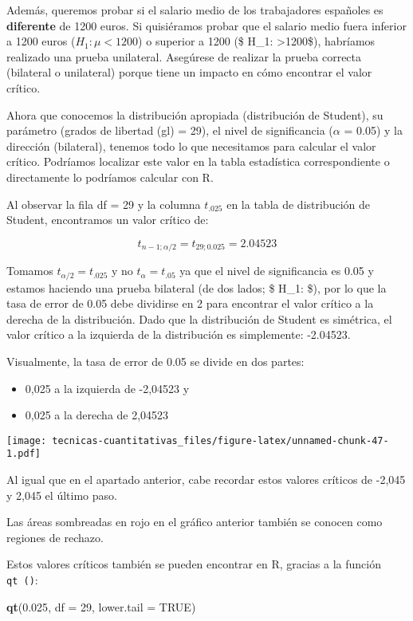 \documentclass[
]{book}
\newenvironment{Shaded}{\begin{snugshade}}{\end{snugshade}}
\newcommand{\DataTypeTok}[1]{\textcolor[rgb]{0.13,0.29,0.53}{#1}}
\newcommand{\DecValTok}[1]{\textcolor[rgb]{0.00,0.00,0.81}{#1}}
\newcommand{\FloatTok}[1]{\textcolor[rgb]{0.00,0.00,0.81}{#1}}
\newcommand{\KeywordTok}[1]{\textcolor[rgb]{0.13,0.29,0.53}{\textbf{#1}}}
\newcommand{\NormalTok}[1]{#1}
\newcommand{\OtherTok}[1]{\textcolor[rgb]{0.56,0.35,0.01}{#1}}
\providecommand{\tightlist}{%
  \setlength{\itemsep}{0pt}\setlength{\parskip}{0pt}}
\begin{document}
Además, queremos probar si el salario medio de los trabajadores españoles es \textbf{diferente} de 1200 euros. Si quisiéramos probar que el salario medio fuera inferior a 1200 euros (\(H_1: \mu <1200\)) o superior a 1200 (\$ H\_1: \mu\textgreater1200\$), habríamos realizado una prueba unilateral. Asegúrese de realizar la prueba correcta (bilateral o unilateral) porque tiene un impacto en cómo encontrar el valor crítico.

Ahora que conocemos la distribución apropiada (distribución de Student), su parámetro (grados de libertad (gl) = 29), el nivel de significancia (\(\alpha\) = 0.05) y la dirección (bilateral), tenemos todo lo que necesitamos para calcular el valor crítico. Podríamos localizar este valor en la tabla estadística correspondiente o directamente lo podríamos calcular con R.

Al observar la fila df = 29 y la columna \(t_.025\) en la tabla de distribución de Student, encontramos un valor crítico de:

\[t_{n-1;\alpha/2} = t_{29; 0.025} = 2.04523\]

Tomamos \(t_{\alpha/2} = t_.025\) y no \(t_\alpha = t_.05\) ya que el nivel de significancia es 0.05 y estamos haciendo una prueba bilateral (de dos lados; \$ H\_1: \mu{}\$), por lo que la tasa de error de 0.05 debe dividirse en 2 para encontrar el valor crítico a la derecha de la distribución. Dado que la distribución de Student es simétrica, el valor crítico a la izquierda de la distribución es simplemente: -2.04523.

Visualmente, la tasa de error de 0.05 se divide en dos partes:

\begin{itemize}
\tightlist
\item
  0,025 a la izquierda de -2,04523 y
\item
  0,025 a la derecha de 2,04523
\end{itemize}

\texttt{[image: tecnicas-cuantitativas\_files/figure-latex/unnamed-chunk-47-1.pdf]}

Al igual que en el apartado anterior, cabe recordar estos valores críticos de -2,045 y 2,045 el último paso.

Las áreas sombreadas en rojo en el gráfico anterior también se conocen como regiones de rechazo.

Estos valores críticos también se pueden encontrar en R, gracias a la función \texttt{qt\ ()}:

\begin{Shaded}
\begin{Highlighting}[]
\KeywordTok{qt}\NormalTok{(}\FloatTok{0.025}\NormalTok{, }\DataTypeTok{df =} \DecValTok{29}\NormalTok{, }\DataTypeTok{lower.tail =} \OtherTok{TRUE}\NormalTok{)}
\end{Highlighting}
\end{Shaded}
\end{document}
